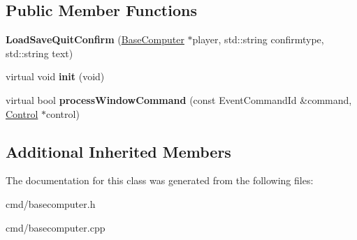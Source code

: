 \subsection*{Public Member Functions}
\begin{DoxyCompactItemize}
\item 
{\bfseries Load\+Save\+Quit\+Confirm} (\hyperlink{classBaseComputer}{Base\+Computer} $\ast$player, std\+::string confirmtype, std\+::string text)\hypertarget{classBaseComputer_1_1LoadSaveQuitConfirm_a03fb85f2e27fa86b2a7d3aafe326148e}{}\label{classBaseComputer_1_1LoadSaveQuitConfirm_a03fb85f2e27fa86b2a7d3aafe326148e}

\item 
virtual void {\bfseries init} (void)\hypertarget{classBaseComputer_1_1LoadSaveQuitConfirm_a15f4128c49b06ede591b5944bb728084}{}\label{classBaseComputer_1_1LoadSaveQuitConfirm_a15f4128c49b06ede591b5944bb728084}

\item 
virtual bool {\bfseries process\+Window\+Command} (const Event\+Command\+Id \&command, \hyperlink{classControl}{Control} $\ast$control)\hypertarget{classBaseComputer_1_1LoadSaveQuitConfirm_ac42e5eef995d4ed87ece911842b66d36}{}\label{classBaseComputer_1_1LoadSaveQuitConfirm_ac42e5eef995d4ed87ece911842b66d36}

\end{DoxyCompactItemize}
\subsection*{Additional Inherited Members}


The documentation for this class was generated from the following files\+:\begin{DoxyCompactItemize}
\item 
cmd/basecomputer.\+h\item 
cmd/basecomputer.\+cpp\end{DoxyCompactItemize}
